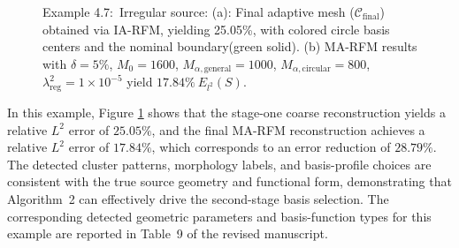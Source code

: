 \documentclass[11pt]{article}
\begin{document}
{\begin{figure}[H]
\begin{subfigure}[b]{0.3\textwidth}
    \end{subfigure}
    \caption{Example 4.7:\ Irregular source: (a): Final adaptive mesh ($\mathcal{C}_{\text{final}}$) obtained via IA-RFM, yielding 25.05\%, with colored circle basis centers and the nominal boundary(green solid). (b) MA-RFM results with $\delta=5\%$, $M_0=1600$, $M_{\alpha,\text{general}}=1000$, $M_{\alpha,\text{circular}}=800$, $\lambda_{\text{reg}}^2=1\times 10^{-5}$ yield $17.84\% \ E_{l^2}(S)$.}
    \label{fig:Irregular:detect_bound}
\end{figure}
In this example, Figure \ref{fig:Irregular:detect_bound} shows that the stage-one coarse reconstruction yields a relative $L^2$ error of $25.05\%$, and the final MA-RFM reconstruction achieves a relative $L^2$ error of $17.84\%$, which corresponds to an error reduction of $28.79\%$. The detected cluster patterns, morphology labels, and basis-profile choices are consistent with the true source geometry and functional form, demonstrating that Algorithm~2 can effectively drive the second-stage basis selection. The corresponding detected geometric parameters and basis-function types for this example are reported in Table~9 of the revised manuscript.}
\end{document}
